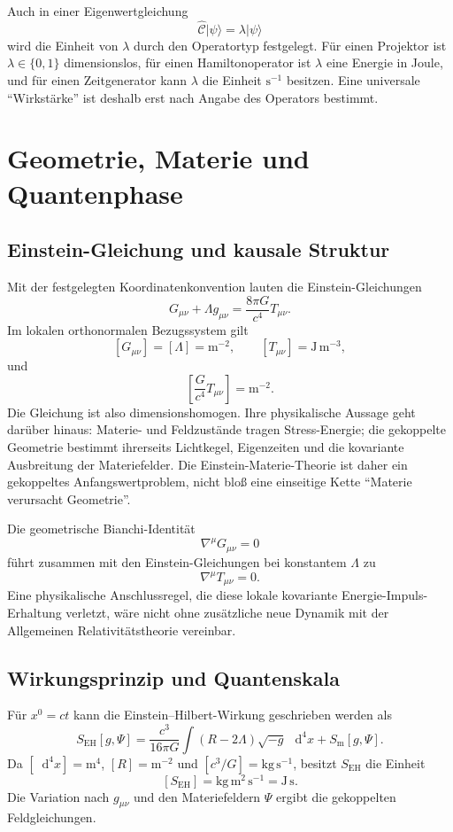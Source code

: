 \documentclass[11pt,a4paper]{article}
\theoremstyle{remark}
\newcommand{\dd}{\mathop{}\!\mathrm{d}}
\begin{document}
Auch in einer Eigenwertgleichung
\[
  \widehat{\mathcal C}\lvert\psi\rangle
  =\lambda\lvert\psi\rangle
\]
wird die Einheit von \(\lambda\) durch den Operatortyp festgelegt. Für einen
Projektor ist \(\lambda\in\{0,1\}\) dimensionslos, für einen Hamiltonoperator
ist \(\lambda\) eine Energie in Joule, und für einen Zeitgenerator kann
\(\lambda\) die Einheit \(\mathrm{s^{-1}}\) besitzen. Eine universale
``Wirkstärke'' ist deshalb erst nach Angabe des Operators bestimmt.

\section{Geometrie, Materie und Quantenphase}
\label{sec:physikalische-kopplung}

\subsection{Einstein-Gleichung und kausale Struktur}

Mit der festgelegten Koordinatenkonvention lauten die Einstein-Gleichungen
\citep{einstein1916,wald1984}
\[
  G_{\mu\nu}+\Lambda g_{\mu\nu}
  =\frac{8\pi G}{c^4}T_{\mu\nu}.
\]
Im lokalen orthonormalen Bezugssystem gilt
\[
  [G_{\mu\nu}]=[\Lambda]=\mathrm{m^{-2}},
  \qquad [T_{\mu\nu}]=\mathrm{J\,m^{-3}},
\]
und
\[
  \left[\frac{G}{c^4}T_{\mu\nu}\right]=\mathrm{m^{-2}}.
\]
Die Gleichung ist also dimensionshomogen. Ihre physikalische Aussage geht
darüber hinaus: Materie- und Feldzustände tragen Stress-Energie; die
gekoppelte Geometrie bestimmt ihrerseits Lichtkegel, Eigenzeiten und die
kovariante Ausbreitung der Materiefelder. Die Einstein-Materie-Theorie ist
daher ein gekoppeltes Anfangswertproblem, nicht bloß eine einseitige Kette
``Materie verursacht Geometrie''.

Die geometrische Bianchi-Identität
\[
  \nabla^\mu G_{\mu\nu}=0
\]
führt zusammen mit den Einstein-Gleichungen bei konstantem \(\Lambda\) zu
\[
  \nabla^\mu T_{\mu\nu}=0.
\]
Eine physikalische Anschlussregel, die diese lokale kovariante
Energie-Impuls-Erhaltung verletzt, wäre nicht ohne zusätzliche neue Dynamik
mit der Allgemeinen Relativitätstheorie vereinbar.

\subsection{Wirkungsprinzip und Quantenskala}

Für \(x^0=ct\) kann die Einstein--Hilbert-Wirkung geschrieben werden als
\[
  S_{\mathrm{EH}}[g,\Psi]
  =\frac{c^3}{16\pi G}
  \int(R-2\Lambda)\sqrt{-g}\,\dd^4x
  +S_{\mathrm m}[g,\Psi].
\]
Da \([\dd^4x]=\mathrm{m^4}\), \([R]=\mathrm{m^{-2}}\) und
\([c^3/G]=\mathrm{kg\,s^{-1}}\), besitzt \(S_{\mathrm{EH}}\) die Einheit
\[
  [S_{\mathrm{EH}}]=\mathrm{kg\,m^2\,s^{-1}}=\mathrm{J\,s}.
\]
Die Variation nach \(g_{\mu\nu}\) und den Materiefeldern \(\Psi\) ergibt
die gekoppelten Feldgleichungen.
\end{document}
